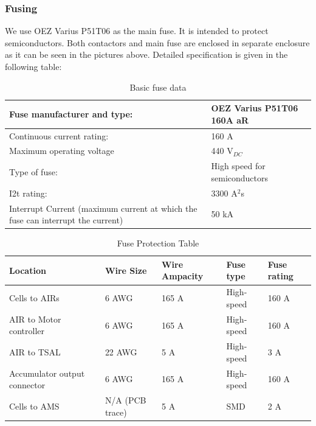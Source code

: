 \subsubsection{Fusing}

We use OEZ Varius P51T06 as the main fuse. It is intended to protect semiconductors. Both contactors and main fuse are enclosed in separate enclosure as it can be seen in the pictures above. Detailed specification is given in the following table:

\begin{table}[H]
	\centering
	\caption{Basic fuse data}
	\begin{tabu}{|X|X|}
		\hline
		Fuse manufacturer and type: & OEZ Varius P51T06 160A aR \\
		\hline
		Continuous current rating:  & 160 A \\
		\hline
		Maximum operating voltage  & 440 V$_{DC}$ \\
		\hline
		Type of fuse: & High speed for semiconductors \\
		\hline
		I2t rating: & 3300 A$^{2}$s \\
		\hline
		Interrupt Current (maximum current at which the fuse can interrupt the current) & 50 kA \\
		\hline
	\end{tabu}%
	\label{tab:acc-fuse}%
\end{table}%



\begin{table}[H]
	\centering
	\caption{Fuse Protection Table}
	\begin{tabu}{|X|X|X|X|X|}
		\hline
		Location & Wire Size & Wire Ampacity & Fuse type & Fuse rating\\
		\hline
		Cells to AIRs & 6 AWG & 165 A & High-speed & 160 A \\
		\hline
		AIR to Motor controller & 6 AWG & 165 A & High-speed & 160 A \\
		\hline
		AIR to TSAL & 22 AWG & 5 A & High-speed & 3 A \\
		\hline
		Accumulator output connector & 6 AWG & 165 A & High-speed  & 160 A \\
		\hline
		Cells to AMS & N/A (PCB trace) & 5 A    & SMD    & 2 A \\
		\hline
	\end{tabu}%
	\label{tab:acc-fuse-protection}%
\end{table}%

